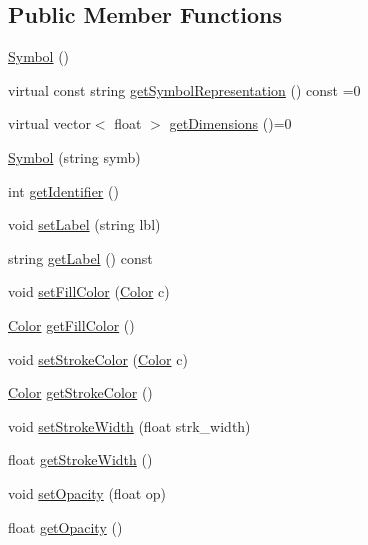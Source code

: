 \subsection*{Public Member Functions}
\begin{DoxyCompactItemize}
\item 
\hyperlink{classbridges_1_1_symbol_a4e1ce195ffc6c99e7f597ef63ed40aa6}{Symbol} ()
\item 
virtual const string \hyperlink{classbridges_1_1_symbol_a4aff4bdfe40cc5609c56539785be97de}{get\+Symbol\+Representation} () const  =0
\item 
virtual vector$<$ float $>$ \hyperlink{classbridges_1_1_symbol_a6eb190dc71b31b344b7610a07c6dc1d5}{get\+Dimensions} ()=0
\item 
\hyperlink{classbridges_1_1_symbol_a047f3b1508fb62efdca8b688f462a866}{Symbol} (string symb)
\item 
int \hyperlink{classbridges_1_1_symbol_a6006dfc7fcaeff3dbead8bcf647ccff6}{get\+Identifier} ()
\item 
void \hyperlink{classbridges_1_1_symbol_afd181fe1e860542548efc4244e06f609}{set\+Label} (string lbl)
\item 
string \hyperlink{classbridges_1_1_symbol_ac09cd7b04df7c5909e27b24fe201e55b}{get\+Label} () const 
\item 
void \hyperlink{classbridges_1_1_symbol_a20315217d30c3c747b5b6da60c08c2c9}{set\+Fill\+Color} (\hyperlink{classbridges_1_1_color}{Color} c)
\item 
\hyperlink{classbridges_1_1_color}{Color} \hyperlink{classbridges_1_1_symbol_affd9e9f49524a920d53a490782fab9c9}{get\+Fill\+Color} ()
\item 
void \hyperlink{classbridges_1_1_symbol_a813783a031eb5fcc841a549be384f876}{set\+Stroke\+Color} (\hyperlink{classbridges_1_1_color}{Color} c)
\item 
\hyperlink{classbridges_1_1_color}{Color} \hyperlink{classbridges_1_1_symbol_ad783260351a4e85612807d039565880d}{get\+Stroke\+Color} ()
\item 
void \hyperlink{classbridges_1_1_symbol_a29e8e8b80ea1aba0a99abdacd7c8ec17}{set\+Stroke\+Width} (float strk\+\_\+width)
\item 
float \hyperlink{classbridges_1_1_symbol_a59ee674a1eaf79c7611ef8377cba2d0b}{get\+Stroke\+Width} ()
\item 
void \hyperlink{classbridges_1_1_symbol_a586939c47e544093cbd8f443bed8dfee}{set\+Opacity} (float op)
\item 
float \hyperlink{classbridges_1_1_symbol_abeda0c1f43346b91f028d2df80e270dc}{get\+Opacity} ()

\end{DoxyCompactItemize}
